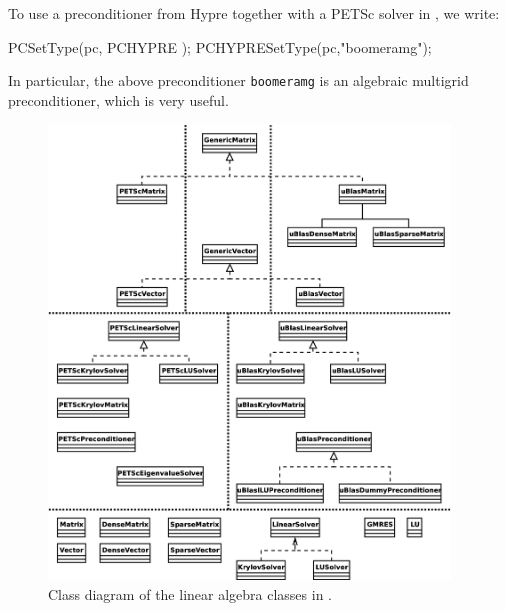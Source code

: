 To use a preconditioner from Hypre together with a PETSc solver in \dolfin{}, we write:  
%
\begin{code}
PCSetType(pc, PCHYPRE );
PCHYPRESetType(pc,"boomeramg");
\end{code}

In particular, the above preconditioner \texttt{boomeramg} is an algebraic multigrid 
preconditioner, which is very useful. 

\begin{figure}
  \begin{center}
    \includegraphics[width=0.95\textwidth]{eps/class-diagram-la.eps}
    \caption{Class diagram of the linear algebra classes in \dolfin{}.}
    \label{fig:laclasses}
  \end{center}
\end{figure}
